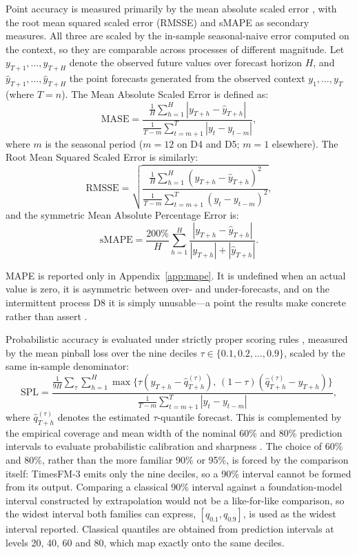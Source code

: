 \documentclass[11pt]{article}
\providecommand{\appendixref}[1]{Appendix~\ref{#1}}
\begin{document}
Point accuracy is measured primarily by the mean absolute scaled error
\citep[MASE;][]{hyndman2006mase}, with the root mean squared scaled error (RMSSE) and sMAPE
as secondary measures. All three are scaled by the in-sample seasonal-naive error computed on
the context, so they are comparable across processes of different magnitude.
Let $y_{T+1}, \dots, y_{T+H}$ denote the observed future values over forecast horizon $H$, and
$\hat{y}_{T+1}, \dots, \hat{y}_{T+H}$ the point forecasts generated from the observed context $y_1, \dots, y_T$
(where $T = n$). The Mean Absolute Scaled Error is defined as:
\begin{equation}
\label{eq:mase}
\text{MASE} = \frac{\frac{1}{H}\sum_{h=1}^H |y_{T+h} - \hat{y}_{T+h}|}{\frac{1}{T-m}\sum_{t=m+1}^T |y_t - y_{t-m}|},
\end{equation}
where $m$ is the seasonal period ($m = 12$ on D4 and D5; $m = 1$ elsewhere). The Root Mean Squared Scaled
Error is similarly:
\begin{equation}
\label{eq:rmsse}
\text{RMSSE} = \sqrt{\frac{\frac{1}{H}\sum_{h=1}^H (y_{T+h} - \hat{y}_{T+h})^2}{\frac{1}{T-m}\sum_{t=m+1}^T (y_t - y_{t-m})^2}},
\end{equation}
and the symmetric Mean Absolute Percentage Error is:
\begin{equation}
\label{eq:smape}
\text{sMAPE} = \frac{200\%}{H} \sum_{h=1}^H \frac{|y_{T+h} - \hat{y}_{T+h}|}{|y_{T+h}| + |\hat{y}_{T+h}|}.
\end{equation}

MAPE is reported only in \appendixref{app:mape}. It is undefined when an actual value is zero,
it is asymmetric between over- and under-forecasts, and on the intermittent process D8 it is
simply unusable---a point the results make concrete rather than assert
\citep{hyndman2006mase, kolassa2016count}.

Probabilistic accuracy is evaluated under strictly proper scoring rules \citep{gneiting2007scoring},
measured by the mean pinball loss over the nine deciles $\tau \in \{0.1, 0.2, \dots, 0.9\}$, scaled by
the same in-sample denominator:
\begin{equation}
\label{eq:spl}
\text{SPL} = \frac{\frac{1}{9H} \sum_{\tau} \sum_{h=1}^H \max\{\tau(y_{T+h} - \hat{q}^{(\tau)}_{T+h}),\, (1-\tau)(\hat{q}^{(\tau)}_{T+h} - y_{T+h})\}}{\frac{1}{T-m}\sum_{t=m+1}^T |y_t - y_{t-m}|},
\end{equation}
where $\hat{q}^{(\tau)}_{T+h}$ denotes the estimated $\tau$-quantile forecast. This is complemented by the
empirical coverage and mean width of the nominal 60\% and 80\% prediction intervals to evaluate
probabilistic calibration and sharpness \citep{gneiting2007calibration}.
The choice of 60\% and 80\%, rather
than the more familiar 90\% or 95\%, is forced by the comparison itself: TimesFM-3 emits only
the nine deciles, so a 90\% interval cannot be formed from its output. Comparing a classical
90\% interval against a foundation-model interval constructed by extrapolation would not be a
like-for-like comparison, so the widest interval both families can express, $[q_{0.1},
q_{0.9}]$, is used as the widest interval reported. Classical quantiles are obtained from
prediction intervals at levels 20, 40, 60 and 80, which map exactly onto the same deciles.
\end{document}
